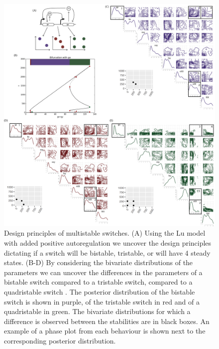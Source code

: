 \begin{figure}[htbp]
	\centerfloat
		\includegraphics[width=1.2\textwidth]{../../chapters/chapterStabilityFinder/images/Lu_234_w.png}
		\caption[ Design principles of multistable switches]{ \label{fig:lu_234}Design principles of multistable switches. (A) Using the Lu model with added positive autoregulation we uncover the design principles dictating if a switch will be bistable, tristable, or will have 4 steady states. (B-D) By considering the bivariate distributions of the parameters we can uncover the differences in the parameters of a bistable switch compared to a tristable switch, compared to a quadristable switch . The posterior distribution of the bistable switch is shown in purple, of the tristable switch in red and of a quadristable in green. The bivariate distributions for which a difference is observed between the stabilities are in black boxes. An example of a phase plot from each behaviour is shown next to the corresponding posterior distribution.}
\end{figure}



